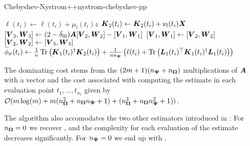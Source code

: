 \documentclass[12pt]{article}
\begin{document}
\begin{algo}{Chebyshev-Nystrom++}{nystrom-chebyshev-pp}
\begin{algorithmic}[1]
            \State $\ell(t_i) \gets \ell(t_i) + \mu_l(t_i) z$ 
        \EndIf
        \State $\boldsymbol{K}_2(t_i) \gets \boldsymbol{K}_2(t_i) + \nu_l(t_i) \boldsymbol{X}$ 
      \EndFor
      \State $[\boldsymbol{V}_3, \boldsymbol{W}_3] \gets (2 - \delta_{l0}) \boldsymbol{A} [\boldsymbol{V}_2, \boldsymbol{W}_2] - [\boldsymbol{V}_1, \boldsymbol{W}_1]$ 
      \State $[\boldsymbol{V}_1, \boldsymbol{W}_1] \gets [\boldsymbol{V}_2, \boldsymbol{W}_2]$
      \State $[\boldsymbol{V}_2, \boldsymbol{W}_2] \gets [\boldsymbol{V}_3, \boldsymbol{W}_3]$
    \EndFor
      \State $\widetilde{\phi}_{\sigma}(t_i) \gets \frac{1}{n} \operatorname{Tr}\left( \boldsymbol{K}_1(t_i)^{\dagger}\boldsymbol{K}_2(t_i) \right) + \frac{1}{n n_{\boldsymbol{\Psi}}} \left( \ell(t_i) + \operatorname{Tr}\left( \boldsymbol{L}_1(t_i)^{\top} \boldsymbol{K}_1(t_i)^{\dagger} \boldsymbol{L}_1(t_i) \right)  \right) $ \label{lin:4-nystromchebyshev-nystrom-pp}
    \EndFor
\end{algorithmic}
\end{algo}

The dominating cost stems from the $(2m + 1)(n_{\boldsymbol{\Psi}} + n_{\boldsymbol{\Omega}})$ multiplications of $\boldsymbol{A}$ with a vector and the cost associated with computing the estimate in each evaluation point $t_1, \dots, t_{n_t}$ given by $\mathcal{O}(m \log(m) + m (n_{\boldsymbol{\Omega}}^2 + n_{\boldsymbol{\Omega}} n_{\boldsymbol{\Psi}} + 1) + (n_{\boldsymbol{\Omega}}^3 + n_{\boldsymbol{\Omega}} n_{\boldsymbol{\Psi}}^2 + 1))$.

The algorithm also accomodates the two other estimators introduced in : For $n_{\boldsymbol{\Omega}} = 0$ we recover , and the complexity for each evaluation of the estimate decreases significantly. For $n_{\boldsymbol{\Psi}} = 0$ we end up with .

\end{document}
